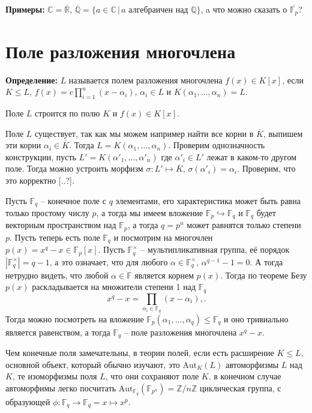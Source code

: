 \documentclass[a4paper, 12pt]{book}
\begin{document}
\textbf{Примеры:} $\mathbb{C}=\overline{\mathbb{R}}$, $\overline{\mathbb{Q}}=\{a\in
\mathbb{C}\,|\,a\text{ алгебраичен над }\mathbb{Q}\}$, a что можно сказать о
$\overline{\mathbb{F}_p}$?

\section{Поле разложения многочлена}

\textbf{Определение:} $L$ называется полем разложения многочлена $f(x)\in K[x]$,
если $K\le L$, $f(x)=c\prod_{i=1}^n(x-\alpha_i),\,\alpha_i\in L$ и $K(\alpha_1,
\ldots,\alpha_n)=L$.

Поле $L$ строится по полю $K$ и $f(x)\in K[x]$.

Поле $L$ существует, так как мы можем например найти все корни в $\overline K$,
выпишем эти корни $\alpha_i\in\overline K$. Тогда $L=K(\alpha_1,\ldots,\alpha_n)$.
Проверим однозначность конструкции, пусть $L'=K(\alpha'_1,\ldots,\alpha'_n)$
где $\alpha'_i\in L'$ лежат в каком-то другом поле. Тогда можно устроить
морфизм $\sigma:L'\mapsto\overline K,\,\sigma(\alpha'_i)=\alpha_i$. Проверим,
что это корректно [..?].

Пусть $\mathbb{F}_q$ – конечное поле с $q$ элементами, его характеристика может
быть равна только простому числу $p$, а тогда мы имеем вложение $\mathbb{F}_p
\hookrightarrow\mathbb{F}_q$ и $\mathbb{F}_q$ будет векторным пространством
над $\mathbb{F}_p$, а тогда $q=p^n$ может равнятся только степени $p$. Пусть
теперь есть поле $\mathbb{F}_q$ и посмотрим на многочлен $p(x)=x^q-x\in
\mathbb{F}_p[x]$. Пусть $\mathbb{F}_q^\times$ – мультипликативная группа, её
порядок $|\mathbb{F}_q^ \times|=q-1$, а это означает, что для любого $\alpha\in
\mathbb{F}_q^\times,\,\alpha^{q-1}-1=0$. А тогда нетрудно видеть, что любой
$\alpha\in\mathbb{F}$ является корнем $p(x)$. Тогда по теореме Безу $p(x)$
раскладывается на множители степени 1 над $\mathbb{F}_q$
\[x^q-x=\prod_{\alpha_i\in\mathbb{F}_q}(x-\alpha_i),.\]
Тогда можно посмотреть на вложение $\mathbb{F}_p(\alpha_1,\ldots,\alpha_q)\le
\mathbb{F}_q$ и оно тривиально является равенством, а тогда $\mathbb{F}_q$ –
поле разложения многочлена $x^q-x$.

Чем конечные поля замечательны, в теории полей, если есть расширение $K\le L$,
основной объект, который обычно изучают, это $\text{Aut}_K(L)$ автоморфизмы $L$
над $K$, те изоморфизмы поля $L$, что они сохраняют поле $K$. в конечном случае
автоморфимы легко посчитать $\text{Aut}_{\mathbb{F}_q}(\mathbb{F}_{p^n})=
\mathbb{Z}/n\mathbb{Z}$ циклическая группа, с образующей $\phi:\mathbb{F}_q
\rightarrow\mathbb{F}_q=x\mapsto x^p$.
\end{document}
